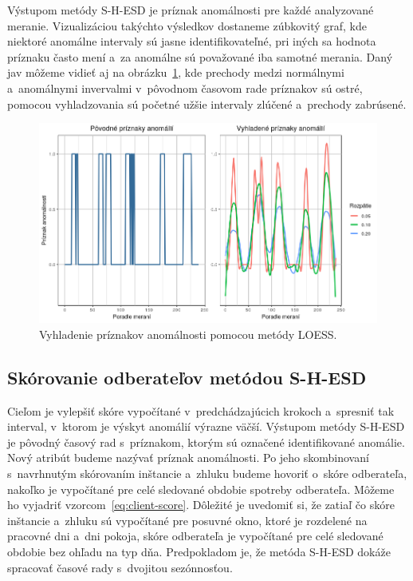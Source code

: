 \documentclass[a4paper,twoside,slovak,12pt,appendix]{article}
\begin{document}
Výstupom metódy S-H-ESD je príznak anomálnosti pre každé analyzované meranie.
Vizualizáciou takýchto výsledkov dostaneme zúbkovitý graf, kde niektoré anomálne
intervaly sú jasne identifikovateľné, pri iných sa hodnota príznaku často mení
a~za anomálne sú považované iba samotné merania. Daný jav môžeme vidieť aj na
obrázku~\ref{fig:smoothing-anomalies}, kde prechody medzi normálnymi
a~anomálnymi invervalmi v~pôvodnom časovom rade príznakov sú ostré, pomocou
vyhladzovania sú početné užšie intervaly zlúčené a~prechody zabrúsené.

\begin{figure}[H]
  \centering
  \includegraphics[width=\textwidth]{smoothing_anomalies.png}
  \caption{Vyhladenie príznakov anomálnosti pomocou metódy LOESS.}
  \label{fig:smoothing-anomalies}
\end{figure}

\subsection{Skórovanie odberateľov metódou S-H-ESD}
\label{c:shesd-scoring}
Cieľom je vylepšiť skóre vypočítané v~predchádzajúcich krokoch a~spresniť tak
interval, v~ktorom je výskyt anomálií výrazne väčší. Výstupom metódy S-H-ESD je
pôvodný časový rad s~príznakom, ktorým sú označené identifikované anomálie. Nový
atribút budeme nazývať príznak anomálnosti. Po jeho skombinovaní s~navrhnutým
skórovaním inštancie a~zhluku budeme hovoriť o~skóre odberateľa, nakoľko je
vypočítané pre celé sledované obdobie spotreby odberateľa. Môžeme ho vyjadriť
vzorcom~\ref{eq:client-score}. Dôležité je uvedomiť si, že zatiaľ čo skóre
inštancie a~zhluku sú vypočítané pre posuvné okno, ktoré je rozdelené na
pracovné dni a~dni pokoja, skóre odberateľa je vypočítané pre celé sledované
obdobie bez ohľadu na typ dňa. Predpokladom je, že metóda S-H-ESD dokáže
spracovať časové rady s~dvojitou sezónnosťou.
\end{document}

